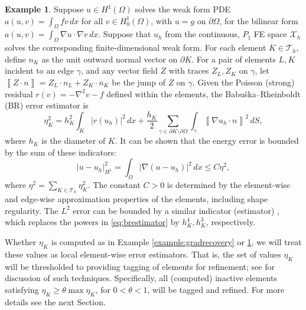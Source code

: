 \documentclass[]{interact}
\theoremstyle{plain}%
\theoremstyle{definition}
\newtheorem{example}[theorem]{Example}
\theoremstyle{remark}
\newcommand{\grad}{\nabla}
\newcommand{\cT}{\mathcal{T}}
\newcommand{\cX}{\mathcal{X}}
\begin{document}
\begin{example}  \label{example:br}  Suppose $u \in H^1(\Omega)$ solves the weak form PDE $a(u,v) = \int_\Omega f v\,dx$ for all $v \in H^1_0(\Omega)$, with $u=g$ on $\partial \Omega$, for the bilinear form $a(u,v)=\int_\Omega \grad u\cdot \grad v\,dx$.  Suppose that $u_h$ from the continuous, $P_1$ FE space $\cX_h$ solves the corresponding finite-dimensional weak form.  For each element $K \in \cT_h$, define $n_K$ as the unit outward normal vector on $\partial K$.  For a pair of elements $L,K$ incident to an edge $\gamma$, and any vector field $Z$ with traces $Z_L,Z_K$ on $\gamma$, let $\left\llbracket Z \cdot n \right\rrbracket = Z_L \cdot n_L + Z_K \cdot n_K$ be the jump of $Z$ on $\gamma$.  Given the Poisson (strong) residual $r(v)=-\nabla^2 v - f$ defined within the elements, the Babu\v{s}ka--Rheinboldt (BR) \cite{BabuskaRheinboldt1979} error estimator is
\begin{equation} \label{eq:brestimator}
\eta_K^2 = h_K^2 \int_K |r(u_h)|^2\,dx + \frac{h_K}{2} \sum_{\gamma \in \partial K \setminus \partial \Omega} \int_{\gamma} \left\llbracket \grad u_h \cdot n \right\rrbracket^2\,dS,
\end{equation}
where $h_K$ is the diameter of $K$.  It can be shown \cite[Chapter 2]{AinsworthOden2000} that the energy error is bounded by the sum of these indicators:
\begin{equation} \label{eq:brbound}
|u-u_h|_{H^1}^2 = \int_\Omega |\grad(u-u_h)|^2\,dx \le C \eta^2,
\end{equation}
where $\eta^2 = \sum_{K\in\cT_h} \eta_K^2$.  The constant $C>0$ is determined by the element-wise and edge-wise approximation properties of the elements, including shape regularity.  The $L^2$ error can be bounded by a similar indicator (estimator) \cite[Section 2.4]{AinsworthOden2000}, which replaces the powers in \eqref{eq:brestimator} by $h_K^4,h_K^3$, respectively.
\end{example}

Whether $\eta_K$ is computed as in Example \ref{example:gradrecovery} or \ref{example:br}, we will treat these values as local element-wise error estimators.  That is, the set of values $\eta_K$ will be thresholded to providing tagging of elements for refinement; see \cite[Section 4.2]{BangerthRannacher2003} for discussion of such techniques.  Specifically, all (computed) inactive elements satisfying $\eta_K \ge \theta \max \eta_K$, for $0<\theta<1$, will be tagged and refined.  For more details see the next Section.
\end{document}

